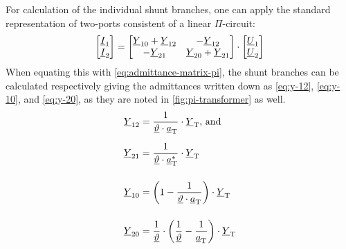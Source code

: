 For calculation of the individual shunt branches, one can apply the standard representation of two-ports consistent of a linear $\Pi$-circuit:
\begin{align}
    \begin{bmatrix}
        \underline{I}_1 \\ \underline{I}_2
    \end{bmatrix}=
    \begin{bmatrix}
        \underline{Y}_{10} + \underline{Y}_{12}& -\underline{Y}_{12} \\
        -\underline{Y}_{21} & \underline{Y}_{20} + \underline{Y}_{21}
    \end{bmatrix} \cdot
    \begin{bmatrix}
        \underline{U}_1 \\ \underline{U}_2
    \end{bmatrix} \notag %
\end{align}
When equating this with \autoref{eq:admittance-matrix-pi}, the shunt branches can be calculated respectively giving the admittances written down as \autoref{eq:y-12}, \autoref{eq:y-10}, and \autoref{eq:y-20}, as they are noted in \autoref{fig:pi-transformer} as well. \autocite{milano_2010,burlakin_2024}
\begin{align}
    \underline{Y}_{12}&=\frac{1}{\underline{\vartheta} \cdot \underline{a}_\mathrm{T}} \cdot \underline{Y}_\mathrm{T}\text{, and} \notag \\[6pt]
    \underline{Y}_{21}&=\frac{1}{\underline{\vartheta} \cdot \underline{a}_\mathrm{T}^*} \cdot \underline{Y}_\mathrm{T} \label{eq:y-12} \\[12pt]
    \underline{Y}_{10}&=\bigg(1 - \frac{1}{\underline{\vartheta} \cdot \underline{a}_\mathrm{T}}\bigg) \cdot \underline{Y}_\mathrm{T} \label{eq:y-10} \\[12pt]
    \underline{Y}_{20}&=\frac{1}{\underline{\vartheta}} \cdot \bigg(\frac{1}{\underline{\vartheta}} - \frac{1}{\underline{a}_\mathrm{T}}\bigg) \cdot \underline{Y}_\mathrm{T} \label{eq:y-20} 
\end{align}

